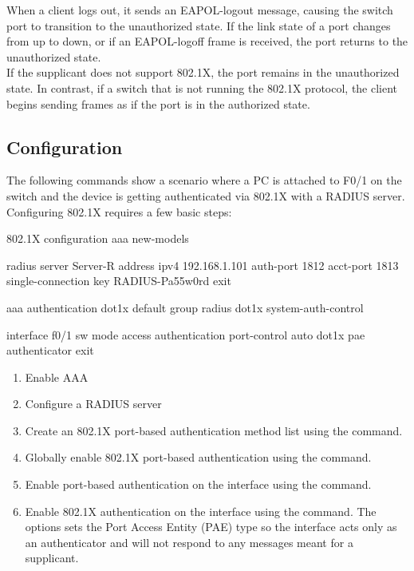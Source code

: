 When a client logs out, it sends an EAPOL-logout message, causing the switch port to transition to the unauthorized state. If the link state of a port changes from up to down, or if an EAPOL-logoff frame is received, the port returns to the unauthorized state.\\    

If the supplicant does not support 802.1X, the port remains in the unauthorized state. In contrast, if a switch that is not running the 802.1X protocol, the client begins sending frames as if the port is in the authorized state.\\


\subsection{Configuration}

The following commands show a scenario where a PC is attached to F0/1 on the switch and the device is getting authenticated via 802.1X with a RADIUS server. Configuring 802.1X requires a few basic steps:



\begin{sexylisting}{802.1X configuration}
aaa new-models

radius server Server-R
  address ipv4 192.168.1.101 auth-port 1812 acct-port 1813
  single-connection
  key RADIUS-Pa55w0rd
  exit
 
aaa authentication dot1x default group radius
dot1x system-auth-control

interface f0/1
  sw mode access
  authentication port-control auto
  dot1x pae authenticator
  exit
\end{sexylisting}

\begin{enumerate}
\item Enable AAA 
\item Configure a RADIUS server
\item Create an 802.1X port-based authentication method list using the  command.
\item Globally enable 802.1X port-based authentication using the  command.
\item Enable port-based authentication on the interface using the  command.
\item Enable 802.1X authentication on the interface using the  command. The  options sets the Port Access Entity (PAE) type so the interface acts only as an authenticator and will not respond to any messages meant for a supplicant.
\end{enumerate}

